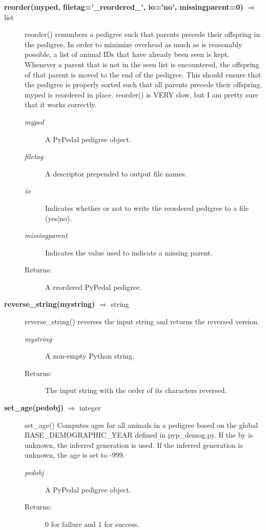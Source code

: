\begin{description}
\item[\textbf{reorder(myped, filetag='\_reordered\_', io='no', missingparent=0)} $\Rightarrow$ list]
reorder() renumbers a pedigree such that parents precede their offspring in the pedigree. In order to minimize overhead as much as is reasonably possible, a list of animal IDs that have already been seen is kept. Whenever a parent that is not in the seen list is encountered, the offspring of that parent is moved to the end of the pedigree. This should ensure that the pedigree is properly sorted such that all parents precede their offspring. myped is reordered in place. reorder() is VERY slow, but I am pretty sure that it works correctly.
\begin{description}
\item[\emph{myped}] A PyPedal pedigree object.
\item[\emph{filetag}] A descriptor prepended to output file names.
\item[\emph{io}] Indicates whether or not to write the reordered pedigree to a file (yes|no).
\item[\emph{missingparent}] Indicates the value used to indicate a missing parent.
\item[Returns:] A reordered PyPedal pedigree.
\end{description}

\item[\textbf{reverse\_string(mystring)} $\Rightarrow$ string]
reverse\_string() reverses the input string and returns the reversed version.
\begin{description}
\item[\emph{mystring}] A non-empty Python string.
\item[Returns:] The input string with the order of its characters reversed.
\end{description}

\item[\textbf{set\_age(pedobj)} $\Rightarrow$ integer]
set\_age() Computes ages for all animals in a pedigree based on the global BASE\_DEMOGRAPHIC\_YEAR defined in pyp\_demog.py. If the by is unknown, the inferred generation is used. If the inferred generation is unknown, the age is set to -999.
\begin{description}
\item[\emph{pedobj}] A PyPedal pedigree object.
\item[Returns:] 0 for failure and 1 for success.
\end{description}


\end{description}
